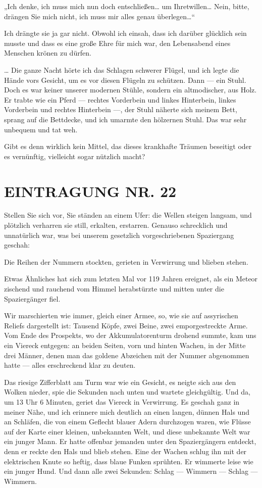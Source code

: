 „Ich denke, ich muss mich nun doch entschließen\ldots{} um
Ihretwillen\ldots{} Nein, bitte, drängen Sie mich nicht, ich muss mir
alles genau überlegen\ldots{}“

Ich drängte sie ja gar nicht. Obwohl ich
einsah, dass ich darüber glücklich sein musste und dass es eine
große Ehre für mich war, den Lebensabend eines Menschen krönen zu
dürfen.

\ldots{} Die ganze Nacht hörte ich das Schlagen schwerer Flügel,
und ich legte die Hände vors Gesicht, um es vor diesen Flügeln zu
schützen. Dann — ein Stuhl. Doch es war keiner unserer modernen
Stühle, sondern ein altmodischer, aus Holz. Er trabte wie ein Pferd
— rechtes Vorderbein und linkes Hinterbein, linkes Vorderbein und
rechtes Hinterbein —, der Stuhl näherte sich meinem
Bett, sprang auf die Bettdecke, und ich umarmte den hölzernen
Stuhl. Das war sehr unbequem und tat weh.

Gibt es denn wirklich
kein Mittel, das dieses krankhafte Träumen beseitigt oder es
vernünftig, vielleicht sogar nützlich macht?

\section{EINTRAGUNG NR. 22}

Stellen Sie sich vor, Sie ständen an einem Ufer: die Wellen steigen
langsam, und plötzlich verharren sie still, erkalten, erstarren.
Genauso schrecklich und unnatürlich war, was bei unserem gesetzlich
vorgeschriebenen Spaziergang geschah:

Die Reihen der Nummern stockten, gerieten in Verwirrung und blieben
stehen.

Etwas Ähnliches hat sich zum letzten Mal vor 119 Jahren ereignet,
als ein Meteor zischend und rauchend vom Himmel herabstürzte und
mitten unter die Spaziergänger fiel.

Wir marschierten wie immer, gleich einer Armee, so, wie sie auf
assyrischen Reliefs dargestellt ist: Tausend Köpfe, zwei Beine,
zwei emporgestreckte Arme. Vom Ende des Prospekts, wo der
Akkumulatorenturm drohend summte, kam uns ein Viereck entgegen: an
beiden Seiten, vorn und hinten Wachen, in der Mitte drei Männer,
denen man das goldene Abzeichen mit der Nummer abgenommen hatte —
alles erschreckend klar zu deuten.

Das riesige Zifferblatt am Turm
war wie ein Gesicht, es neigte sich aus den Wolken nieder, spie die
Sekunden nach unten und wartete gleichgültig. Und da, um 13 Uhr 6
Minuten, geriet das Viereck in Verwirrung. Es geschah ganz in
meiner Nähe, und ich erinnere mich deutlich an einen langen, dünnen
Hals und an Schläfen, die von einem Geflecht blauer Adern
durchzogen waren, wie Flüsse auf der Karte einer kleinen,
unbekannten Welt, und diese unbekannte Welt war ein junger Mann. Er
hatte offenbar jemanden unter den Spaziergängern entdeckt, denn er
reckte den Hals und blieb stehen. Eine der Wachen schlug ihn mit
der elektrischen Knute so heftig, dass blaue Funken sprühten. Er
wimmerte leise wie ein junger Hund. Und dann alle zwei Sekunden:
Schlag — Wimmern — Schlag — Wimmern.

